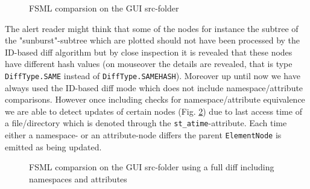 \begin{figure}[tb]
\caption{\label{fig:fsml-gui} FSML comparsion on the GUI src-folder}
\end{figure}

The alert reader might think that some of the nodes for instance the subtree of the "sunburst"-subtree which are plotted should not have been processed by the ID-based diff algorithm but by close inspection it is revealed that these nodes have different hash values (on mouseover the details are revealed, that is type \texttt{DiffType.SAME} instead of \texttt{DiffType.SAMEHASH}). Moreover up until now we have always used the ID-based diff mode which does not include namespace/attribute comparisons. However once including checks for namespace/attribute equivalence we are able to detect updates of certain nodes (Fig. \ref{fig:fsml-gui-fulldiff}) due to last access time of a file/directory which is denoted through the \texttt{st\_atime}-attribute. Each time either a namespace- or an attribute-node differs the parent \texttt{ElementNode} is emitted as being updated.

\begin{figure}[tb]
\caption{\label{fig:fsml-gui-fulldiff} FSML comparsion on the GUI src-folder using a full diff including namespaces and attributes}
\end{figure}

